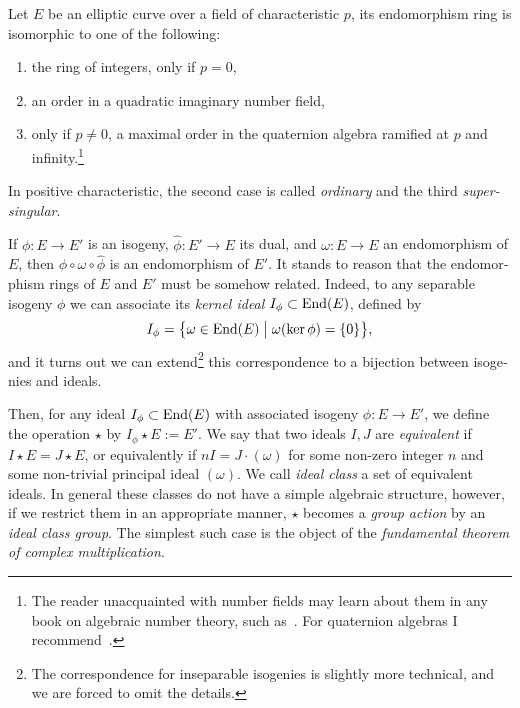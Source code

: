 \begin{otherlanguage}{english}
  \begin{theorem}
    Let $E$ be an elliptic curve over a field of characteristic $p$,
    its endomorphism ring is isomorphic to one of the following:
    \begin{enumerate}
    \item the ring of integers, only if $p=0$,
    \item an order in a quadratic imaginary number field,
    \item only if $p\ne 0$, a maximal order in the quaternion algebra
      ramified at $p$ and infinity.\footnote{The reader unacquainted
        with number fields may learn about them in any book on
        algebraic number theory,
        such as~\cite{langANT,neukirch2013algebraic,Cohen1993}.  For
        quaternion algebras I recommend~\cite{Vigneras_1980,voight}.}
    \end{enumerate}
    In positive characteristic, the second case is called
    \emph{ordinary} and the third \emph{supersingular}.
  \end{theorem}

  If $\phi:E\to E'$ is an isogeny, $\hat\phi:E'\to E$ its dual, and
  $\omega:E\to E$ an endomorphism of $E$, then $\phi\circ\omega\circ\hat\phi$ is
  an endomorphism of $E'$. It stands to reason that the endomorphism
  rings of $E$ and $E'$ must be somehow related.  Indeed, to any
  separable isogeny $\phi$ we can associate its \emph{kernel ideal}
  $I_\phi\subset\mathrm{End}(E)$, defined by
  \[I_\phi = \bigl\{ \omega \in \mathrm{End}(E) \;\big\vert\; \omega(\ker\phi)
    = \{0\} \bigr\},\] %
  and it turns out we can extend\footnote{The correspondence for
    inseparable isogenies is slightly more technical, and we are
    forced to omit the details.} this correspondence to a bijection
  between isogenies and ideals.

  Then, for any ideal $I_\phi\subset\mathrm{End}(E)$ with associated isogeny
  $\phi:E\to E'$, we define the operation $\star$ by
  $I_\phi\star E := E'$. We say that two ideals $I,J$ are
  \emph{equivalent} if $I\star E=J\star E$, or equivalently if
  $nI=J\cdot(\omega)$ for some non-zero integer $n$ and some non-trivial principal ideal
  $(\omega)$. We call \emph{ideal class} a set of equivalent
  ideals. In general these classes do not have a simple algebraic
  structure, however, if we restrict them in an appropriate manner,
  $\star$ becomes a \emph{group action} by an \emph{ideal class
    group}. The simplest such case is the object of the
  \emph{fundamental theorem of complex multiplication}.


\end{otherlanguage}
